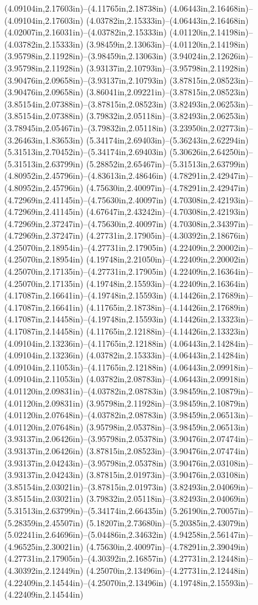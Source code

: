 (4.09104in,2.17603in)--(4.11765in,2.18738in) (4.06443in,2.16468in)--(4.09104in,2.17603in) (4.03782in,2.15333in)--(4.06443in,2.16468in) (4.02007in,2.16031in)--(4.03782in,2.15333in) (4.01120in,2.14198in)--(4.03782in,2.15333in) (3.98459in,2.13063in)--(4.01120in,2.14198in) (3.95798in,2.11928in)--(3.98459in,2.13063in) (3.94024in,2.12626in)--(3.95798in,2.11928in) (3.93137in,2.10793in)--(3.95798in,2.11928in) (3.90476in,2.09658in)--(3.93137in,2.10793in) (3.87815in,2.08523in)--(3.90476in,2.09658in) (3.86041in,2.09221in)--(3.87815in,2.08523in) (3.85154in,2.07388in)--(3.87815in,2.08523in) (3.82493in,2.06253in)--(3.85154in,2.07388in) (3.79832in,2.05118in)--(3.82493in,2.06253in) (3.78945in,2.05467in)--(3.79832in,2.05118in) (3.23950in,2.02773in)--(3.26463in,1.83653in) (5.34174in,2.69403in)--(5.36243in,2.62294in) (5.31513in,2.70452in)--(5.34174in,2.69403in) (5.30626in,2.64250in)--(5.31513in,2.63799in) (5.28852in,2.65467in)--(5.31513in,2.63799in) (4.80952in,2.45796in)--(4.83613in,2.48646in) (4.78291in,2.42947in)--(4.80952in,2.45796in) (4.75630in,2.40097in)--(4.78291in,2.42947in) (4.72969in,2.41145in)--(4.75630in,2.40097in) (4.70308in,2.42193in)--(4.72969in,2.41145in) (4.67647in,2.43242in)--(4.70308in,2.42193in) (4.72969in,2.37247in)--(4.75630in,2.40097in) (4.70308in,2.34397in)--(4.72969in,2.37247in) (4.27731in,2.17905in)--(4.30392in,2.18676in) (4.25070in,2.18954in)--(4.27731in,2.17905in) (4.22409in,2.20002in)--(4.25070in,2.18954in) (4.19748in,2.21050in)--(4.22409in,2.20002in) (4.25070in,2.17135in)--(4.27731in,2.17905in) (4.22409in,2.16364in)--(4.25070in,2.17135in) (4.19748in,2.15593in)--(4.22409in,2.16364in) (4.17087in,2.16641in)--(4.19748in,2.15593in) (4.14426in,2.17689in)--(4.17087in,2.16641in) (4.11765in,2.18738in)--(4.14426in,2.17689in) (4.17087in,2.14458in)--(4.19748in,2.15593in) (4.14426in,2.13323in)--(4.17087in,2.14458in) (4.11765in,2.12188in)--(4.14426in,2.13323in) (4.09104in,2.13236in)--(4.11765in,2.12188in) (4.06443in,2.14284in)--(4.09104in,2.13236in) (4.03782in,2.15333in)--(4.06443in,2.14284in) (4.09104in,2.11053in)--(4.11765in,2.12188in) (4.06443in,2.09918in)--(4.09104in,2.11053in) (4.03782in,2.08783in)--(4.06443in,2.09918in) (4.01120in,2.09831in)--(4.03782in,2.08783in) (3.98459in,2.10879in)--(4.01120in,2.09831in) (3.95798in,2.11928in)--(3.98459in,2.10879in) (4.01120in,2.07648in)--(4.03782in,2.08783in) (3.98459in,2.06513in)--(4.01120in,2.07648in) (3.95798in,2.05378in)--(3.98459in,2.06513in) (3.93137in,2.06426in)--(3.95798in,2.05378in) (3.90476in,2.07474in)--(3.93137in,2.06426in) (3.87815in,2.08523in)--(3.90476in,2.07474in) (3.93137in,2.04243in)--(3.95798in,2.05378in) (3.90476in,2.03108in)--(3.93137in,2.04243in) (3.87815in,2.01973in)--(3.90476in,2.03108in) (3.85154in,2.03021in)--(3.87815in,2.01973in) (3.82493in,2.04069in)--(3.85154in,2.03021in) (3.79832in,2.05118in)--(3.82493in,2.04069in) (5.31513in,2.63799in)--(5.34174in,2.66435in) (5.26190in,2.70057in)--(5.28359in,2.45507in) (5.18207in,2.73680in)--(5.20385in,2.43079in) (5.02241in,2.64696in)--(5.04486in,2.34632in) (4.94258in,2.56147in)--(4.96525in,2.30021in) (4.75630in,2.40097in)--(4.78291in,2.39049in) (4.27731in,2.17905in)--(4.30392in,2.16857in) (4.27731in,2.12448in)--(4.30392in,2.12449in) (4.25070in,2.13496in)--(4.27731in,2.12448in) (4.22409in,2.14544in)--(4.25070in,2.13496in) (4.19748in,2.15593in)--(4.22409in,2.14544in) 
